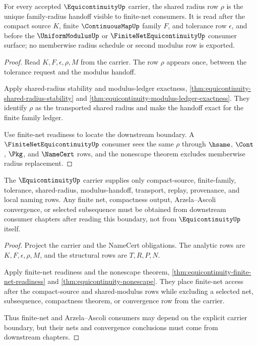 \begin{theorem}
\label{thm:equicontinuity-root-unblock-family-modulus-exactness}
For every accepted $\EquicontinuityUp$ carrier, the shared radius row $\rho$ is the unique family-radius handoff visible to finite-net consumers. It is read after the compact source $K$, finite $\ContinuousMapUp$ family $F$, and tolerance row $\epsilon$, and before the $\UniformModulusUp$ or $\FiniteNetEquicontinuityUp$ consumer surface; no memberwise radius schedule or second modulus row is exported.
\end{theorem}
\begin{proof}
Read $K,F,\epsilon,\rho,M$ from the carrier. The row $\rho$ appears once, between the tolerance request and the modulus handoff.

Apply shared-radius stability and modulus-ledger exactness, \autoref{thm:equicontinuity-shared-radius-stability} and \autoref{thm:equicontinuity-modulus-ledger-exactness}. They identify $\rho$ as the transported shared radius and make the handoff exact for the finite family ledger.

Use finite-net readiness to locate the downstream boundary. A $\FiniteNetEquicontinuityUp$ consumer sees the same $\rho$ through $\hsame$, $\Cont$, $\Pkg$, and $\NameCert$ rows, and the nonescape theorem excludes memberwise radius replacement.
\end{proof}

\begin{theorem}
\label{thm:equicontinuity-root-unblock-finite-net-consumer-boundary}
The $\EquicontinuityUp$ carrier supplies only compact-source, finite-family, tolerance, shared-radius, modulus-handoff, transport, replay, provenance, and local naming rows. Any finite net, compactness output, Arzela--Ascoli convergence, or selected subsequence must be obtained from downstream consumer chapters after reading this boundary, not from $\EquicontinuityUp$ itself.
\end{theorem}
\begin{proof}
Project the carrier and the NameCert obligations. The analytic rows are $K,F,\epsilon,\rho,M$, and the structural rows are $T,R,P,N$.

Apply finite-net readiness and the nonescape theorem, \autoref{thm:equicontinuity-finite-net-readiness} and \autoref{thm:equicontinuity-nonescape}. They place finite-net access after the compact-source and shared-modulus rows while excluding a selected net, subsequence, compactness theorem, or convergence row from the carrier.

Thus finite-net and Arzela--Ascoli consumers may depend on the explicit carrier boundary, but their nets and convergence conclusions must come from downstream chapters.
\end{proof}

